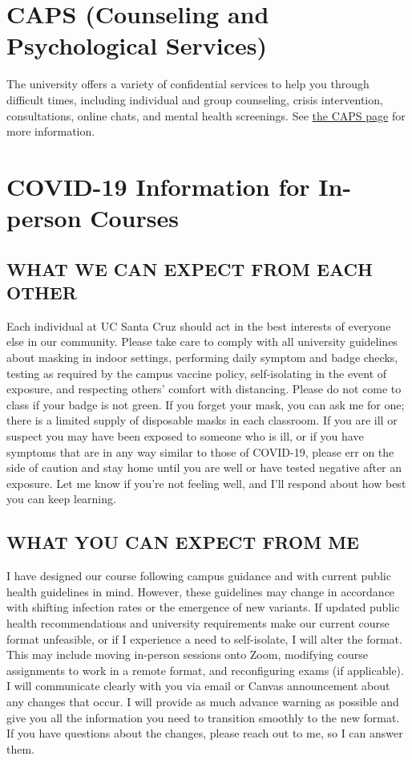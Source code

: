 \documentclass[12pt]{article}
\begin{document}
\section{CAPS (Counseling and Psychological Services)}
The university offers a variety of confidential services to help you through difficult times, including individual and group counseling, crisis intervention, consultations, online chats, and mental health screenings. See \href{https://caps.ucsc.edu/}{the CAPS page} for more information.

\section{COVID-19 Information for In-person Courses} 
\subsection{WHAT WE CAN EXPECT FROM EACH OTHER}
Each individual at UC Santa Cruz should act in the best interests of everyone else in our community. Please take care to comply with all university guidelines about masking in indoor settings, performing daily symptom and badge checks, testing as required by the campus vaccine policy, self-isolating in the event of exposure, and respecting others' comfort with distancing. Please do not come to class if your badge is not green. If you forget your mask, you can ask me for one; there is a limited supply of disposable masks in each classroom. If you are ill or suspect you may have been exposed to someone who is ill, or if you have symptoms that are in any way similar to those of COVID-19, please err on the side of caution and stay home until you are well or have tested negative after an exposure. Let me know if you're not feeling well, and I'll respond about how best you can keep learning.
 
\subsection{WHAT YOU CAN EXPECT FROM ME}
I have designed our course following campus guidance and with current public health guidelines in mind. However, these guidelines may change in accordance with shifting infection rates or the emergence of new variants. If updated public health recommendations and university requirements make our current course format unfeasible, or if I experience a need to self-isolate, I will alter the format. This may include moving in-person sessions onto Zoom, modifying course assignments to work in a remote format, and reconfiguring exams (if applicable). I will communicate clearly with you via email or Canvas announcement about any changes that occur. I will provide as much advance warning as possible and give you all the information you need to transition smoothly to the new format. If you have questions about the changes, please reach out to me, so I can answer them.
 
\end{document}
